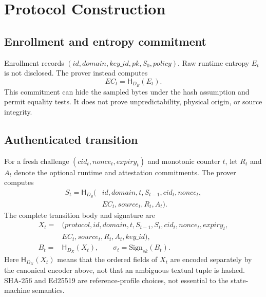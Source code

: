 \documentclass[11pt]{article}
\newcommand{\Hash}{\mathsf{H}}
\begin{document}
\section{Protocol Construction}
\subsection{Enrollment and entropy commitment}
Enrollment records $(id,domain,key\_id,pk,S_0,policy)$. Raw runtime entropy $E_t$ is not disclosed. The prover instead computes
\begin{equation}
  EC_t=\Hash_{D_E}(E_t).
\end{equation}
This commitment can hide the sampled bytes under the hash assumption and permit equality tests. It does not prove unpredictability, physical origin, or source integrity.

\subsection{Authenticated transition}
For a fresh challenge $(cid_t,nonce_t,expiry_t)$ and monotonic counter $t$, let $R_t$ and $A_t$ denote the optional runtime and attestation commitments. The prover computes
\begin{align}
  S_t=\Hash_{D_S}(&id,domain,t,S_{t-1},cid_t,nonce_t,\nonumber\\
                  &EC_t,source_t,R_t,A_t).
\end{align}
The complete transition body and signature are
\begin{align}
X_t={}&(protocol,id,domain,t,S_{t-1},S_t,cid_t,nonce_t,expiry_t,\nonumber\\
      &EC_t,source_t,R_t,A_t,key\_id),\\
B_t={}&\Hash_{D_X}(X_t),\qquad \sigma_t=\mathrm{Sign}_{sk}(B_t).
\end{align}
Here $\Hash_{D_X}(X_t)$ means that the ordered fields of $X_t$ are encoded separately by the canonical encoder above, not that an ambiguous textual tuple is hashed. SHA-256 and Ed25519 are reference-profile choices, not essential to the state-machine semantics.
\end{document}
